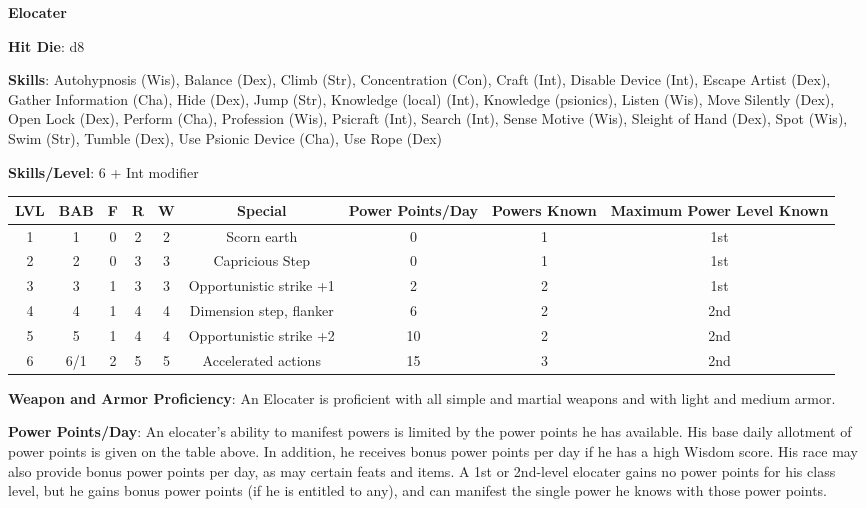 \textbf{\huge{Elocater}}

\textbf{Hit Die}: d8

\textbf{Skills}: Autohypnosis (Wis), Balance (Dex), Climb (Str), Concentration (Con), Craft (Int), Disable Device (Int), Escape Artist (Dex), Gather Information (Cha), Hide (Dex), Jump (Str), Knowledge (local) (Int), Knowledge (psionics), Listen (Wis), Move Silently (Dex), Open Lock (Dex), Perform (Cha), Profession (Wis), Psicraft (Int), Search (Int), Sense Motive (Wis), Sleight of Hand (Dex), Spot (Wis), Swim (Str), Tumble (Dex), Use Psionic Device (Cha), Use Rope (Dex)

\textbf{Skills/Level}: 6 + Int modifier

\begin{center}
\begin{adjustwidth}{-4cm}{}
\begin{small}
\begin{tabular}{| c | c | c | c | c | c | c | c | c |}
\hline
LVL &BAB &F &R &W &Special &Power Points/Day &Powers Known &Maximum Power Level Known \\
\hline
1 &1 &0 &2 &2 &Scorn earth &0 &1 &1st \\
2 &2 &0 &3 &3 &Capricious Step &0 &1 &1st \\
3 &3 &1 &3 &3 &Opportunistic strike +1 &2 &2 &1st \\
4 &4 &1 &4 &4 &Dimension step, flanker &6 &2 &2nd \\
5 &5 &1 &4 &4 &Opportunistic strike +2 &10 &2 &2nd \\
6 &6/1 &2 &5 &5 &Accelerated actions &15 &3 &2nd \\
\hline
\end{tabular}
\end{small}
\end{adjustwidth}
\end{center}

\textbf{Weapon and Armor Proficiency}: An Elocater is proficient with all simple and martial weapons and with light and medium armor.

\textbf{Power Points/Day}: An elocater’s ability to manifest powers is limited by the power points he has available. His base daily allotment of power points is given on the table above. In addition, he receives bonus power points per day if he has a high Wisdom score. His race may also provide bonus power points per day, as may certain feats and items. A 1st or 2nd-level elocater gains no power points for his class level, but he gains bonus power points (if he is entitled to any), and can manifest the single power he knows with those power points.

